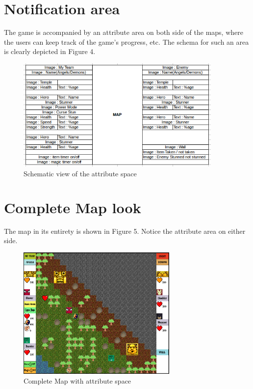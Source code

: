 \section{Notification area}
The game is accompanied by an attribute area on both side of the maps, where the users can keep track of the game’s progress, etc. The schema for such an area is clearly depicted in Figure 4. 

\begin{figure}[htp]
\centering
\includegraphics[width=0.9\textwidth]{attribute_space.png}
\caption{\label{fig:attribute}Schematic view of the attribute space}
\end{figure}


\section{Complete Map look}
The map in its entirety is shown in Figure 5. Notice the attribute area on either side.

\begin{figure}[htp]
\centering
\includegraphics[width=0.7\textwidth]{Map_Attributes.png}
\caption{\label{fig:attributeMap}Complete Map with attribute space}
\end{figure}

